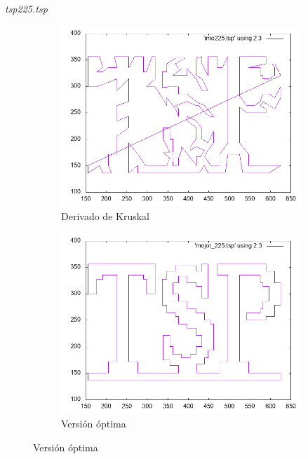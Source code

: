 \documentclass{beamer}
\begin{document}
\begin{frame}[fragile]{\textit{tsp225.tsp}}
\begin{figure}[H]
\begin{subfigure}[b]{0.36\textwidth}
\includegraphics[width=\textwidth]{tsp225_ime.png}
\caption*{\small{Derivado de Kruskal}}
\end{subfigure}
\quad
\begin{subfigure}[b]{0.36\textwidth}
\includegraphics[width=\textwidth]{tsp225_mejor.png}
\caption*{\small{Versión óptima}}
\end{subfigure}
\end{figure}

\end{frame}
\end{document}
